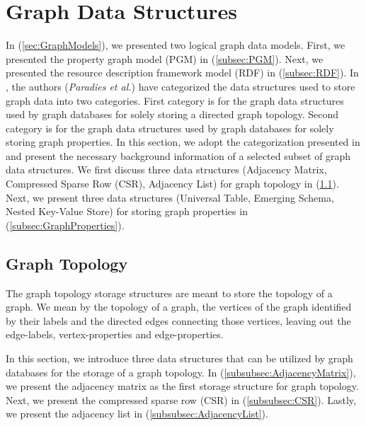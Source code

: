 {\section{Graph Data Structures}
\label{sec:StorageStructures}

In (\ref{sec:GraphModels}), we presented two logical graph data models. First, we presented the property graph model (PGM) in (\ref{subsec:PGM}). Next, we presented the resource description framework model (RDF) in (\ref{subsec:RDF}). In \cite{Paradies2017},  the authors (\textit{Paradies et al.}) have categorized the data structures used to store graph data into two categories. First category is for the graph data structures used by graph databases for solely storing a directed graph topology. Second category is for the graph data structures used by graph databases for solely storing graph properties. In this section, we adopt the categorization presented in \cite{Paradies2017} and present the necessary background information of a selected subset of graph data structures. We first discuss three data structures (Adjacency Matrix, Compressed Sparse Row (CSR), Adjacency List) for graph topology in (\ref{subsec:GraphTopology}). Next, we present three data structures (Universal Table, Emerging Schema, Nested Key-Value Store) for storing graph properties in (\ref{subsec:GraphProperties}).


\subsection{Graph Topology}
\label{subsec:GraphTopology}

The graph topology storage structures are meant to store the topology of a graph. We mean by the topology of a graph, the vertices of the graph identified by their labels and the directed edges connecting those vertices, leaving out the edge-labels, vertex-properties and edge-properties.

In this section, we introduce three data structures that can be utilized by graph databases for the storage of a graph topology. In (\ref{subsubsec:AdjacencyMatrix}), we present the adjacency matrix as the first storage structure for graph topology. Next, we present the compressed sparse row (CSR) in (\ref{subsubsec:CSR}). Lastly, we present the adjacency list in (\ref{subsubsec:AdjacencyList}).


}

